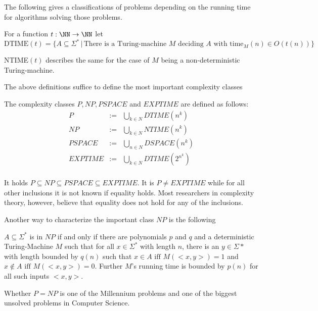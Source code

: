       The following gives a classifications of problems depending on the
      running time for algorithms solving those problems.
		\begin{definition}
			For a function $t: \NN \to \NN$ let 
      $$ \text{DTIME}(t) = \{ A \subseteq \Sigma^* \,|\, \text{There is a
      Turing-machine } M \text{ deciding } A \text{ with time}_M(n) \in O(t(n)) \} $$

      NTIME$(t)$ describes the same for the case of $M$ being a
      non-deterministic Turing-machine.
		\end{definition}
		The above definitions suffice to define the most important complexity classes
		\begin{definition}
			The complexity classes $P, NP, PSPACE$ and $EXPTIME$ are defined as follows:
			\begin{eqnarray*}
				P & := & \bigcup_{k \in N} DTIME(n^k) \\
				NP & := & \bigcup_{k \in N} NTIME(n^k) \\
				PSPACE & := & \bigcup_{n \in N} DSPACE(n^k) \\
				EXPTIME & := & \bigcup_{k \in N} DTIME(2^{n^k}) \\
			\end{eqnarray*}
		\end{definition}
		It holds $P \subseteq NP \subseteq PSPACE \subseteq EXPTIME$. 
		It is $P \neq EXPTIME$ while for all other inclusions it is not known if equality holds.
    Most researchers in complexity theory, however, believe that equality does
    not hold for any of the inclusions.

    Another way to characterize the important class $NP$ is the following
    \begin{theorem}
      $A \subseteq \Sigma^*$ is in $NP$ if and only if there are polynomials
      $p$ and $q$ and a deterministic Turing-Machine $M$ such that for all $x
      \in \Sigma^*$ with length $n$, there is an $y \in \Sigma*$ with length
      bounded by $q(n)$ such that $x \in A \text{ iff } M(<x,y>) = 1$ and 
      $x \not \in A \text{ iff } M(<x,y>) = 0$. 
      Further $M$'s running time is bounded by $p(n)$ for all such inputs
      $<x,y>$.  
    \end{theorem}
		Whether $P = NP$ is one of the Millennium problems and one of the biggest unsolved problems in Computer Science.

